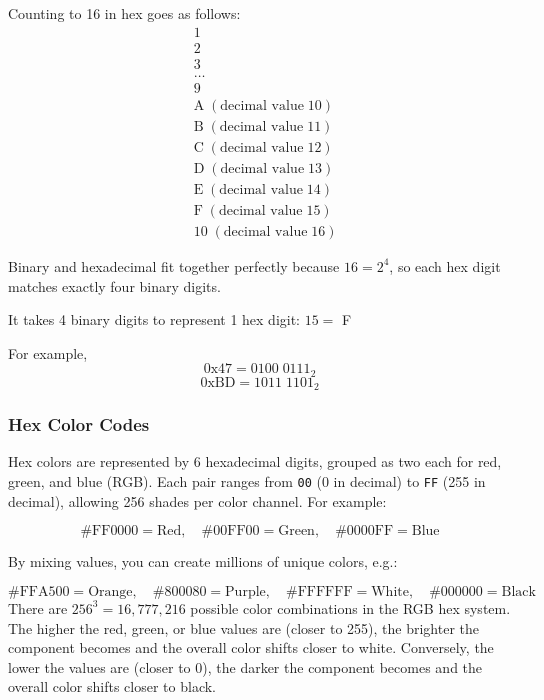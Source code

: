 Counting to 16 in hex goes as follows:
\begin{align*}
  &1 \\
  &2 \\
  &3 \\
  &\dots \\
  &9 \\
  &\text{A} \; (\text{decimal value} \;  10) \\
  &\text{B} \; (\text{decimal value} \; 11) \\
  &\text{C} \; (\text{decimal value} \; 12) \\
  &\text{D} \; (\text{decimal value} \; 13) \\
  &\text{E} \; (\text{decimal value} \; 14) \\
  &\text{F} \; (\text{decimal value} \; 15) \\
  &10 \; (\text{decimal value} \; 16)
\end{align*}

Binary and hexadecimal fit together perfectly because $16 = 2^4$, so each hex digit matches exactly four binary digits. 

It takes 4 binary digits to represent 1 hex digit: $15 =$ F

For example,
\[0\text{x}47 = 0100 \; 0111_{2}\]
\[0\text{x}\text{BD} = 1011 \; 1101_{2}\]


\subsubsection{Hex Color Codes}
Hex colors are represented by 6 hexadecimal digits, grouped as two each for red, green, and blue (RGB). Each pair ranges from \texttt{00} (0 in decimal) to \texttt{FF} (255 in decimal), allowing 256 shades per color channel. For example:

$$
\#\text{FF}0000 = \text{Red}, \quad\#00\text{FF}00 = \text{Green}, \quad \#0000\text{FF} = \text{Blue}
$$

By mixing values, you can create millions of unique colors, e.g.:

$$
\#\text{FFA}500 = \text{Orange}, \quad \#800080 = \text{Purple}, \quad \#\text{FFFFFF} = \text{White}, \quad \#000000 = \text{Black}
$$
There are $256^3 = 16{,}777{,}216$ possible color combinations in the RGB hex system. The higher the red, green, or blue values are (closer to 255), the brighter the component becomes and the overall color shifts closer to white. Conversely, the lower the values are (closer to 0), the darker the component becomes and the overall color shifts closer to black.

